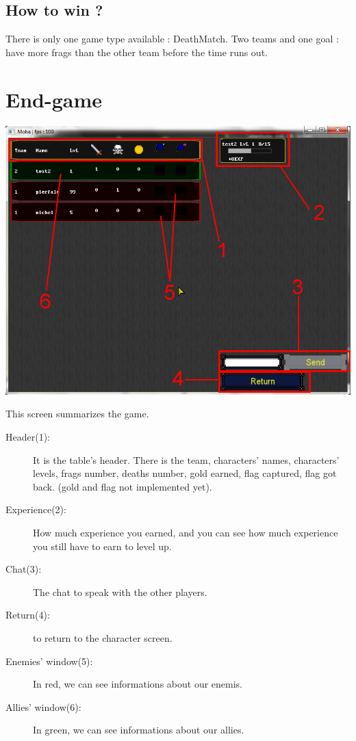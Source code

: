 \documentclass{scrreprt}
\begin{document}
		  \section{How to win ?}
		There is only one game type available : DeathMatch. Two teams and one goal : have more frags than the other team before the time runs out.
		  \chapter{End-game}
		  \begin{center}
		  \includegraphics[scale=0.4]{end_screen.png}
		  \end{center}
		  This screen summarizes the game.
		  \begin{description}
		  \item[Header(1):]It is the table's header. There is the team,  characters' names, characters' levels, frags number, deaths number, gold earned, flag captured, flag got back. (gold and flag not implemented yet).
		  \item[Experience(2):]How much experience you earned, and you can see how much experience you still have to earn to level up.
		  \item[Chat(3):] The chat to speak with the other players.
		  \item[Return(4):] to return to the character screen.
		  \item[Enemies' window(5):] In red, we can see informations about our enemis.
		  \item[Allies' window(6):] In green, we can see informations about our allies.
		  \end{description}
\end{document}
